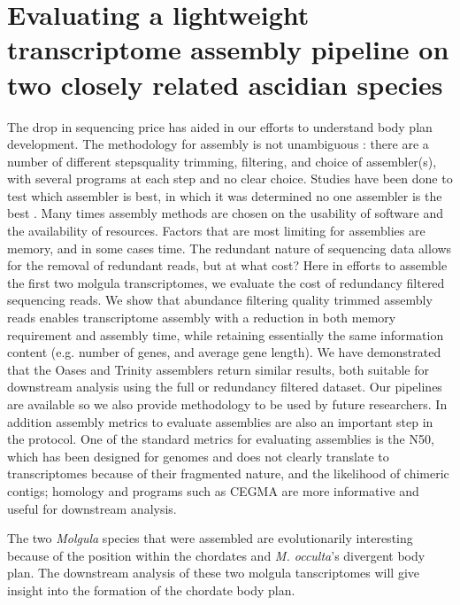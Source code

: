 \section{Evaluating a lightweight transcriptome assembly pipeline on two closely related ascidian species}
The drop in sequencing price has aided in our efforts to understand body plan development. %
The methodology for assembly is not unambiguous : there are a number of different steps\textemdash quality trimming, filtering, and choice of assembler(s), with several programs at each step and no clear choice. Studies have been done to test which assembler is best, in which it was determined no one assembler is the best \cite{clarke_comparative_2013}. Many times assembly methods are chosen on the usability of software and the availability of resources. Factors that are most limiting for assemblies are memory, and in some cases time. The redundant nature of sequencing data allows for the removal of redundant reads, but at what cost? Here in efforts to assemble the first two molgula transcriptomes, we evaluate the cost of redundancy filtered sequencing reads. We show that abundance filtering quality trimmed assembly reads enables transcriptome assembly with a reduction in both memory requirement and assembly time, while retaining essentially the same information content (e.g. number of genes, and average gene length). We have demonstrated that the Oases and Trinity assemblers return similar results, both suitable for downstream analysis using the full or redundancy filtered dataset. Our pipelines are available so we also provide methodology to be used by future researchers. In addition assembly metrics to evaluate assemblies are also an important step in the protocol. One of the standard metrics for evaluating assemblies is the N50, which has been designed for genomes and does not clearly translate to transcriptomes because of their fragmented nature, and the likelihood of chimeric contigs; homology and programs such as CEGMA are more informative and useful for downstream analysis. %
 
The two \textit{Molgula} species that were assembled are evolutionarily interesting because of the position within the chordates and \textit{M. occulta}'s divergent body plan. The downstream analysis of these two molgula tanscriptomes will give insight into the formation of the chordate body plan. 

